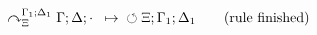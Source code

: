 \begin{align}
\curvearrowright_{\Xi}^{\Gamma_1; \Delta_1} \Gamma; \Delta; \cdot \;\; \mapsto \;\; \circlearrowleft \Xi ; \Gamma_1; \Delta_1 \tag{rule finished}
\end{align}
